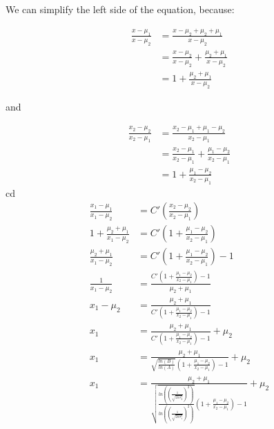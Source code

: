 \documentclass[10pt,a4paper]{article}
\begin{document}
	We can simplify the left side of the equation, because:
	
	\begin{align*}
		\frac{x-\mu_1}{x-\mu_2} &= \frac{x-\mu_2+\mu_2+\mu_1}{x-\mu_2}\\
		&= \frac{x-\mu_2}{x-\mu_2}+\frac{\mu_2+\mu_1}{x-\mu_2}\\
		&= 1 + \frac{\mu_2+\mu_1}{x-\mu_2}
	\end{align*}
	
	and
	
	\begin{align*}
	\frac{x_2-\mu_2}{x_2-\mu_1} &= \frac{x_2-\mu_1+\mu_1-\mu_2}{x_2-\mu_1}\\
	&= \frac{x_2-\mu_1}{x_2-\mu_1}+\frac{\mu_1-\mu_2}{x_2-\mu_1}\\
	&= 1 +\frac{\mu_1-\mu_2}{x_2-\mu_1}
	\end{align*}
	cd
	\begin{align*}
	\frac{x_1-\mu_1}{x_1-\mu_2} &= C'(\frac{x_2-\mu_2}{x_2-\mu_1})\\
	1 + \frac{\mu_2+\mu_1}{x_1-\mu_2} &= C'(1 +\frac{\mu_1-\mu_2}{x_2-\mu_1})\\
	\frac{\mu_2+\mu_1}{x_1-\mu_2} &= C'(1 +\frac{\mu_1-\mu_2}{x_2-\mu_1}) - 1\\
	\frac{1}{x_1-\mu_2} &=\frac{C'(1 +\frac{\mu_1-\mu_2}{x_2-\mu_1}) - 1}{\mu_2+\mu_1}\\
	x_1-\mu_2 &=\frac{\mu_2+\mu_1}{C'(1 +\frac{\mu_1-\mu_2}{x_2-\mu_1}) - 1}\\
	x_1 &=\frac{\mu_2+\mu_1}{C'(1 +\frac{\mu_1-\mu_2}{x_2-\mu_1}) - 1} + \mu_2\\
	x_1 &=\frac{\mu_2+\mu_1}{\sqrt{\frac{ln(B)}{ln(A)}}(1 +\frac{\mu_1-\mu_2}{x_2-\mu_1}) - 1} + \mu_2\\
	x_1 &=\frac{\mu_2+\mu_1}{\sqrt{\frac{ln( (\frac{1}{\sqrt{2\pi\sigma_2^2}})^2)}{ln((\frac{1}{\sqrt{2\pi\sigma_1^2}})^2)}}(1 +\frac{\mu_1-\mu_2}{x_2-\mu_1}) - 1} + \mu_2\\
	\end{align*}
	
\end{document}
